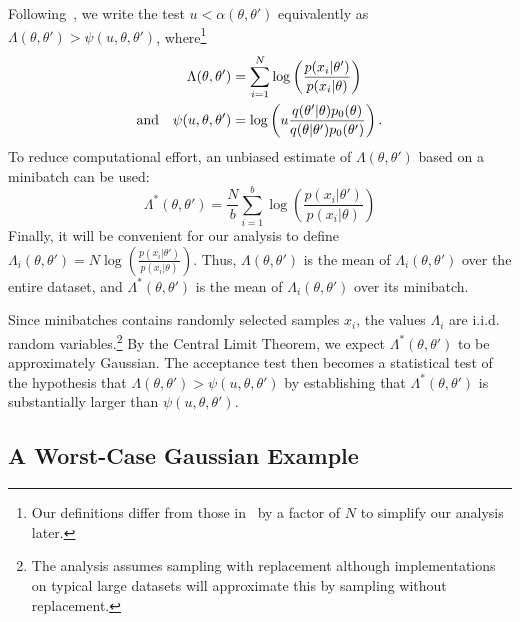 \documentclass[twoside]{article} \usepackage{aistats2017}
\begin{document}
Following~\citet{icml2014c1_bardenet14}, we write the test
$u<\alpha(\theta,\theta')$ equivalently as $\Lambda(\theta,\theta') >
\psi(u,\theta,\theta')$, where\footnote{Our definitions differ from those
in~\citet{icml2014c1_bardenet14} by a factor of $N$ to simplify our analysis
later.}
\begin{equation}
\begin{split} 
\Lambda(\theta,\theta') & = \sum_{i=1}^N \log\left(\frac{p(x_i|\theta')}{p(x_i|\theta)}\right) \\  
{\rm and} \quad \psi(u,\theta,\theta') &= \log\left(u\frac{q(\theta'|\theta)p_0(\theta)}{q(\theta|\theta')p_0(\theta')}\right).
\end{split}
\end{equation}
To reduce computational effort, an unbiased estimate of $\Lambda(\theta,\theta')$
based on a minibatch can be used:
\begin{equation}
\Lambda^*(\theta,\theta') = \frac{N}{b}\sum_{i=1}^b \log\left(\frac{p(x_i|\theta')}{p(x_i|\theta)}\right)  
\end{equation}
Finally, it will be convenient for our analysis to define
$\Lambda_i(\theta,\theta') = N\log(\frac{p(x_i|\theta')}{p(x_i|\theta)})$.
Thus, $\Lambda(\theta,\theta')$ is the mean of $\Lambda_i(\theta,\theta')$ over
the entire dataset, and $\Lambda^*(\theta,\theta')$ is the mean of
$\Lambda_i(\theta,\theta')$ over its minibatch. 

Since minibatches contains randomly selected samples $x_i$, the values
$\Lambda_i$ are i.i.d. random variables.\footnote{The analysis assumes sampling
with replacement although implementations on typical large datasets will
approximate this by sampling without replacement.} By the Central Limit
Theorem, we expect $\Lambda^*(\theta,\theta')$ to be approximately Gaussian. The
acceptance test then becomes a statistical test of the hypothesis that
$\Lambda(\theta,\theta')>\psi(u,\theta,\theta')$ by establishing that
$\Lambda^*(\theta,\theta')$ is substantially larger than
$\psi(u,\theta,\theta')$.


\subsection{A Worst-Case Gaussian Example}\label{ssec:gaussian_example}
\end{document}
